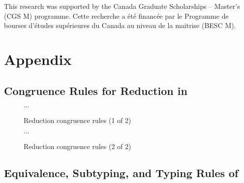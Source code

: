 \documentclass[acmsmall,review,anonymous]{acmart}\settopmatter{printfolios=true,printccs=false,printacmref=false}
\begin{document}
\begin{acks}
This research was supported by the Canada Graduate Scholarships -- Master’s (CGS M) programme.
Cette recherche a \'et\'e financ\'ee par le Programme de bourses d'\'etudes sup\'erieures
du Canada au niveau de la maitrise (BESC M).
\end{acks}



\clearpage
\appendix
\section{Appendix}




\allowdisplaybreaks

\subsection{Congruence Rules for Reduction in \lang} \label{app:cong:red}

\begin{figure}[h]
\centering
\fbox{$\red{\Phi; \Gamma}{\tau}{\tau}$} \qquad $\cdots$ \hfill
{}
\caption{Reduction congruence rules (1 of 2)}
\label{fig:cong:red*}
\end{figure}

\begin{figure}[h]
\centering
\fbox{$\red{\Phi; \Gamma}{\tau}{\tau}$} \qquad $\cdots$ \hfill
{}
\caption{Reduction congruence rules (2 of 2)}
\label{fig:cong:red*}
\end{figure}

\clearpage
\subsection{Equivalence, Subtyping, and Typing Rules of \CICE} \label{app:equiv}
\end{document}
